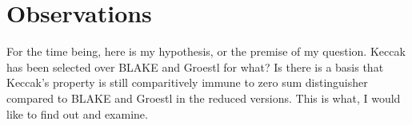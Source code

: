 \chapter{Observations}




For the time being, here is my hypothesis, or the premise of my question. Keccak has been selected over BLAKE and
Groestl for what? Is there is a basis that Keccak's property is still comparitively immune to zero sum distinguisher
compared to BLAKE and Groestl in the reduced versions. This is what, I would like to find out and examine.
